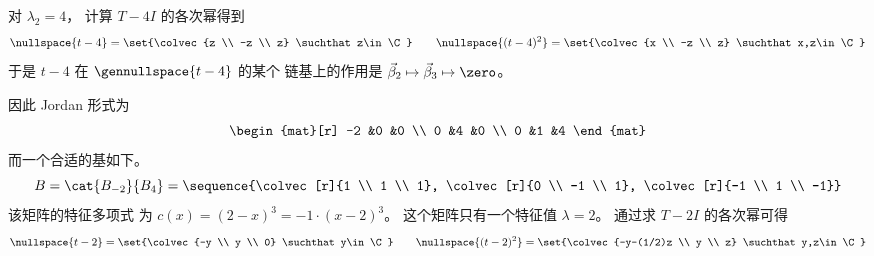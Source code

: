 \begin{exercises}
\begin{answer}
\begin{exparts}
            对 $\lambda_2=4$，
            计算 $T-4I$ 的各次幂得到
            \begin{equation*}
              \nullspace{t-4}=\set{\colvec{z \\ -z \\ z}
                                      \suchthat z\in\C} 
              \qquad
              \nullspace{(t-4)^2}=\set{\colvec{x \\ -z \\ z}
                                           \suchthat x,z\in\C}
            \end{equation*}
            于是 $t-4$ 在 $\gennullspace{t-4}$ 的某个
            链基上的作用是
            $\vec{\beta}_2\mapsto\vec{\beta}_3\mapsto\zero$。

            因此 Jordan 形式为  
            \begin{equation*}
              \begin{mat}[r]
                -2  &0  &0  \\
                 0  &4  &0  \\
                 0  &1  &4
              \end{mat}
            \end{equation*}
            而一个合适的基如下。
            \begin{equation*}
              B=\cat{B_{-2}}{B_4}=
                \sequence{\colvec[r]{1 \\ 1 \\ 1},
                          \colvec[r]{0 \\ -1 \\ 1},
                          \colvec[r]{-1 \\ 1 \\ -1}}
            \end{equation*}
        \partsitem 该矩阵的特征多项式
            为 \( c(x)=(2-x)^3=-1\cdot (x-2)^3 \)。
            这个矩阵只有一个特征值 $\lambda=2$。
            通过求 $T-2I$ 的各次幂可得
            \begin{equation*}
              \nullspace{t-2}=\set{\colvec{-y \\ y \\ 0}
                                      \suchthat y\in\C} 
              \qquad
              \nullspace{(t-2)^2}=\set{\colvec{-y-(1/2)z \\ y \\ z}
                                          \suchthat y,z\in\C}
            \end{equation*}

\end{exparts}
\end{answer}
\end{exercises}
